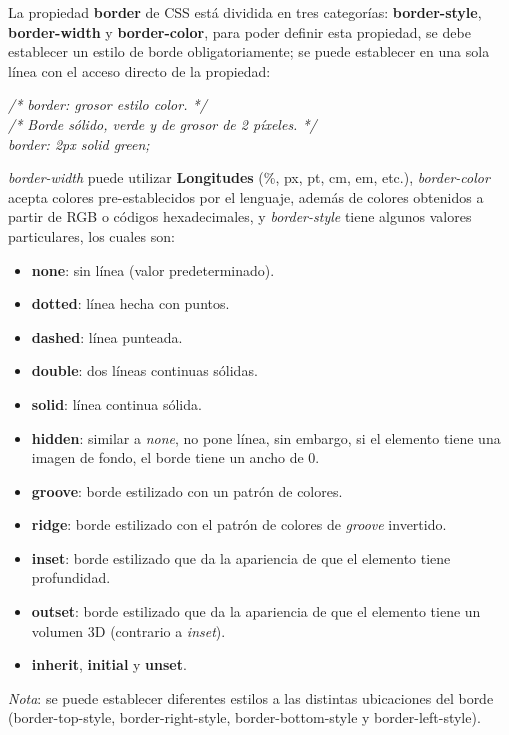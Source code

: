 La propiedad \textbf{border} de CSS está dividida en tres categorías: \textbf{border-style}, \textbf{border-width} y \textbf{border-color}, para poder definir esta propiedad, se debe establecer un estilo de borde obligatoriamente; se puede establecer en una sola línea con el acceso directo de la propiedad:
\begin{center}
    \textit{
        /* border: grosor estilo color. */ \\
        /* Borde sólido, verde y de grosor de 2 píxeles. */ \\
        border: 2px solid green;
    }
\end{center}

\textit{border-width} puede utilizar \textbf{Longitudes} (\%, px, pt, cm, em, etc.), \textit{border-color} acepta colores pre-establecidos por el lenguaje, además de colores obtenidos a partir de RGB o códigos hexadecimales, y \textit{border-style} tiene algunos valores particulares, los cuales son:
\begin{itemize}
    \item \textbf{none}: sin línea (valor predeterminado).
    \item \textbf{dotted}: línea hecha con puntos.
    \item \textbf{dashed}: línea punteada.
    \item \textbf{double}: dos líneas continuas sólidas.
    \item \textbf{solid}: línea continua sólida.
    \item \textbf{hidden}: similar a \textit{none}, no pone línea, sin embargo, si el elemento tiene una imagen de fondo, el borde tiene un ancho de 0.
    \item \textbf{groove}: borde estilizado con un patrón de colores.
    \item \textbf{ridge}: borde estilizado con el patrón de colores de \textit{groove} invertido.
    \item \textbf{inset}: borde estilizado que da la apariencia de que el elemento tiene profundidad.
    \item \textbf{outset}: borde estilizado que da la apariencia de que el elemento tiene un volumen 3D (contrario a \textit{inset}).
    \item \textbf{inherit}, \textbf{initial} y \textbf{unset}.
\end{itemize}

\textit{Nota}: se puede establecer diferentes estilos a las distintas ubicaciones del borde (border-top-style, border-right-style, border-bottom-style y border-left-style).

